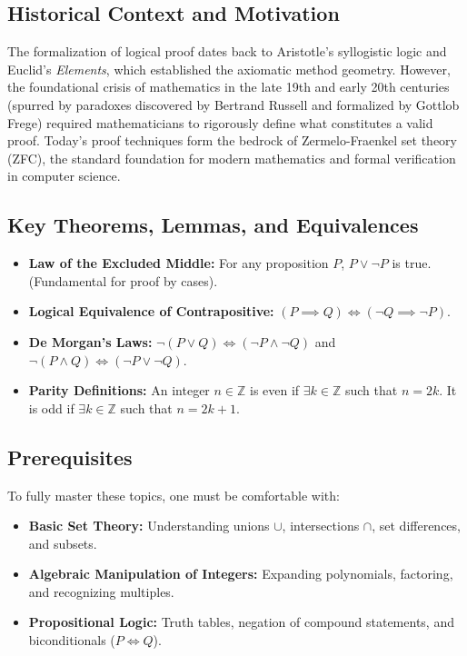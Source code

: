 \documentclass[11pt, letterpaper]{article}
\theoremstyle{definition}
\theoremstyle{remark}
\newcommand{\Z}{\mathbb{Z}}
\begin{document}
\subsection{Historical Context and Motivation}
The formalization of logical proof dates back to Aristotle's syllogistic logic and Euclid's \textit{Elements}, which established the axiomatic method geometry. However, the foundational crisis of mathematics in the late 19th and early 20th centuries (spurred by paradoxes discovered by Bertrand Russell and formalized by Gottlob Frege) required mathematicians to rigorously define what constitutes a valid proof. Today's proof techniques form the bedrock of Zermelo-Fraenkel set theory (ZFC), the standard foundation for modern mathematics and formal verification in computer science.

\subsection{Key Theorems, Lemmas, and Equivalences}
\begin{itemize}
    \item \textbf{Law of the Excluded Middle:} For any proposition $P$, $P \lor \neg P$ is true. (Fundamental for proof by cases).
    \item \textbf{Logical Equivalence of Contrapositive:} $(P \implies Q) \iff (\neg Q \implies \neg P)$.
    \item \textbf{De Morgan's Laws:} $\neg(P \lor Q) \iff (\neg P \land \neg Q)$ and $\neg(P \land Q) \iff (\neg P \lor \neg Q)$.
    \item \textbf{Parity Definitions:} An integer $n \in \Z$ is even if $\exists k \in \Z$ such that $n = 2k$. It is odd if $\exists k \in \Z$ such that $n = 2k + 1$. 
\end{itemize}

\subsection{Prerequisites}
To fully master these topics, one must be comfortable with:
\begin{itemize}
    \item \textbf{Basic Set Theory:} Understanding unions $\cup$, intersections $\cap$, set differences, and subsets.
    \item \textbf{Algebraic Manipulation of Integers:} Expanding polynomials, factoring, and recognizing multiples.
    \item \textbf{Propositional Logic:} Truth tables, negation of compound statements, and biconditionals ($P \iff Q$).
\end{itemize}
\end{document}
